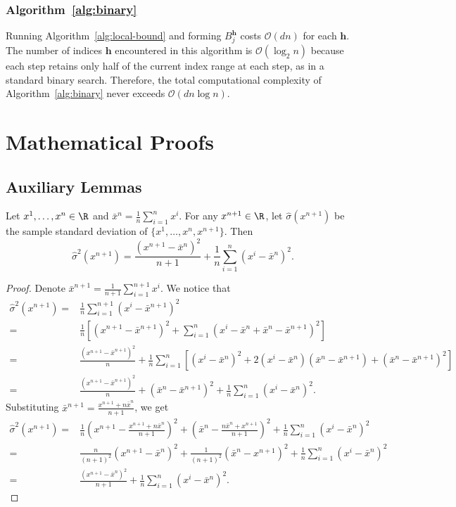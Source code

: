 \subsubsection{Algorithm~\ref{alg:binary}} \label{app:backward-binary}
Running Algorithm~\ref{alg:local-bound} and forming $B^{\mathbf{h}}_j$ costs $\mathcal{O}(dn)$ for each $\mathbf{h}$. The number of indices $\mathbf{h}$ encountered in this algorithm is $\mathcal{O}(\log_2{n})$ because each step retains only half of the current index range at each step, as in a standard binary search. Therefore, the total computational complexity of Algorithm~\ref{alg:binary} never exceeds $\mathcal{O}(dn\log{n})$.

\clearpage

\section{Mathematical Proofs} 
\label{app:proofs}

\subsection{Auxiliary Lemmas}\label{app:proofs-lemmas}

\begin{lemma}\label{lem:1}
    Let $x^1,\ldots,x^n \in \R$ and $\bar{x}^n = \frac{1}{n}\sum^n_{i=1}x^i$. For any $x^{n+1}\in \R$, let $\hat\sigma(x^{n+1})$ be the sample standard deviation of $\{x^1,\ldots,x^n, x^{n+1}\}$. Then
    \[
    \hat\sigma^2(x^{n+1}) = \frac{(x^{n+1}-\bar{x}^{n})^2}{n+1}+\frac{1}{n}\sum^n_{i=1}(x^i-\bar{x}^{n})^2.
    \]
\end{lemma}
\begin{proof}
    Denote $\bar{x}^{n+1} = \frac{1}{n+1}\sum^{n+1}_{i=1}x^i$. We notice that
\begin{align*}
    \hat\sigma^2(x^{n+1}) = &\frac{1}{n}\sum^{n+1}_{i=1}(x^i-\bar{x}^{n+1})^2\\
    = &\frac{1}{n} \left[ (x^{n+1}-\bar{x}^{n+1})^2+\sum^n_{i=1}(x^i-\bar{x}^{n}+\bar{x}^{n}-\bar{x}^{n+1})^2 \right]\\
    = &\frac{(x^{n+1}-\bar{x}^{n+1})^2}{n}+\frac{1}{n}\sum^n_{i=1}\left[(x^i-\bar{x}^{n})^2+2(x^i-\bar{x}^n)(\bar{x}^n-\bar{x}^{n+1})+(\bar{x}^{n}-\bar{x}^{n+1})^2\right]\\
    = &\frac{(x^{n+1}-\bar{x}^{n+1})^2}{n}+(\bar{x}^{n}-\bar{x}^{n+1})^2+\frac{1}{n}\sum^n_{i=1}(x^i-\bar{x}^{n})^2.
\end{align*}
Substituting $\bar{x}^{n+1} = \frac{x^{n+1}+n\bar{x}^n}{n+1}$, we get
\begin{align*}    
    \hat\sigma^2(x^{n+1}) = &\frac{1}{n}\left(x^{n+1}-\frac{x^{n+1}+n\bar{x}^n}{n+1}\right)^2+\left(\bar{x}^n-\frac{n\bar{x}^n+x^{n+1}}{n+1}\right)^2+\frac{1}{n}\sum^n_{i=1}(x^i-\bar{x}^{n})^2\\
    = &\frac{n}{(n+1)^2}(x^{n+1}-\bar{x}^n)^2+\frac{1}{(n+1)^2}(\bar{x}^n-x^{n+1})^2+\frac{1}{n}\sum^n_{i=1}(x^i-\bar{x}^{n})^2\\
    = &\frac{(x^{n+1}-\bar{x}^{n})^2}{n+1}+\frac{1}{n}\sum^n_{i=1}(x^i-\bar{x}^{n})^2.
\end{align*}
\end{proof}

